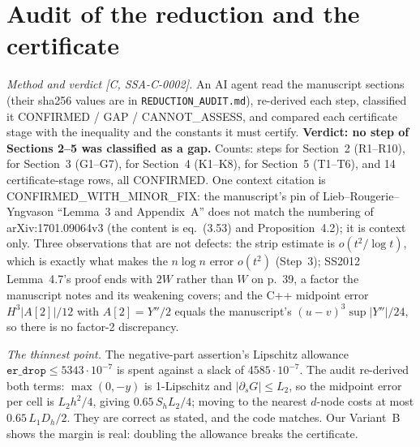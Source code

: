 \documentclass[10pt]{article}
\newcommand{\tier}[1]{\textsf{[#1]}}
\begin{document}
\section{Audit of the reduction and the certificate}\label{sec:audit}
\emph{Method and verdict \tier{C, SSA-C-0002}.} An AI agent read the manuscript sections (their sha256 values are in \texttt{REDUCTION\_AUDIT.md}), re-derived each step, classified it CONFIRMED / GAP / CANNOT\_ASSESS, and compared each certificate stage with the inequality and the constants it must certify.
\textbf{Verdict: no step of Sections 2--5 was classified as a gap.} Counts: \SSAnR{} steps for Section~2 (R1--R10), \SSAnG{} for Section~3 (G1--G7), \SSAnK{} for Section~4 (K1--K8), \SSAnT{} for Section~5 (T1--T6), and 14 certificate-stage rows, all CONFIRMED. One context citation is CONFIRMED\_WITH\_MINOR\_FIX: the manuscript's pin of Lieb--Rougerie--Yngvason ``Lemma~3 and Appendix~A'' does not match the numbering of arXiv:1701.09064v3 (the content is eq.~(3.53) and Proposition~4.2); it is context only.
Three observations that are not defects: the strip estimate is $o(t^2/\log t)$, which is exactly what makes the $n\log n$ error $o(t^2)$ (Step~3); SS2012 Lemma~4.7's proof ends with $2W$ rather than $W$ on p.~39, a factor the manuscript notes and its weakening covers; and the C++ midpoint error $H^3|A[2]|/12$ with $A[2]=Y''/2$ equals the manuscript's $(u-v)^3\sup|Y''|/24$, so there is no factor-2 discrepancy.

\emph{The thinnest point.} The negative-part assertion's Lipschitz allowance $\texttt{er\_drop}\le5343\cdot10^{-7}$ is spent against a slack of $4585\cdot10^{-7}$. The audit re-derived both terms: $\max(0,-y)$ is 1-Lipschitz and $|\partial_sG|\le L_2$, so the midpoint error per cell is $L_2h^2/4$, giving $0.65\,S_hL_2/4$; moving to the nearest $d$-node costs at most $0.65\,L_1D_h/2$. They are correct as stated, and the code matches. Our Variant~B shows the margin is real: doubling the allowance breaks the certificate.
\end{document}
